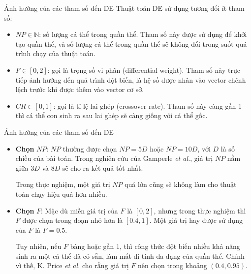 \begin{frame}{Ảnh hưởng của các tham số đến DE}
Thuật toán DE sử dụng tương đối ít tham số:
\begin{itemize}
\item \( NP \in \mathbb{N} \): số lượng cá thể trong quần thể. Tham số này được
  sử dụng để khởi tạo quần thể, và số lượng cá thể trong quần thể sẽ không đổi
  trong suốt quá trình chạy của thuật toán.
\item \( F \in [0, 2] \): gọi là trọng số vi phân (differential weight). Tham số
  này trực tiếp ảnh hưởng đến quá trình đột biến, là hệ số được nhân vào vector
  chênh lệch trước khi được thêm vào vector cơ sở.
\item \( CR \in [0, 1] \): gọi là tỉ lệ lai ghép (crossover rate). Tham số này
  càng gần 1 thì cá thể con sinh ra sau lai ghép sẽ càng giống với cá thể gốc.
\end{itemize}
\end{frame}

\begin{frame}{Ảnh hưởng của các tham số đến DE}
  \begin{itemize}
  \item 
  \textbf{Chọn} \( NP \): \( NP \) thường được chọn \( NP = 5D \) hoặc \( NP = 10D \), với \( D \) là
  số chiều của bài toán. Trong nghiên cứu của Gamperle \textit{et al.}, giá trị
  \( NP \) nằm giữa \( 3D \) và \( 8D \) sẽ cho ra kết quả tốt nhất.

  Trong thực nghiệm, một giá trị \( NP \) quá lớn cũng sẽ không làm cho thuật
  toán chạy hiệu quả hơn nhiều.

\item \textbf{Chọn} \( F \):
  Mặc dù miền giá trị của \( F \) là \( [0, 2] \), nhưng trong thực nghiệm thì
  \( F \) được chọn trong đoạn nhỏ hơn là \( [0.4, 1] \). Một giá trị hay được
  sử dụng của \( F \) là \( F = 0.5 \).

  Tuy nhiên, nếu \( F \) bàng hoặc gần \( 1 \), thì công thức đột biến nhiều khả
  năng sinh ra một cá thể đã có sẵn, làm mất đi tính đa dạng của quần
  thể. Chính vì thế, K. Price \textit{et al.} cho rằng giá trị \( F \) nên chọn
  trong khoảng \( (0.4, 0.95) \).
\end{itemize}
\end{frame}

